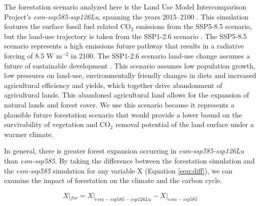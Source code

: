 \documentclass[draft]{agujournal2019}
\begin{document}
The forestation scenario analyzed here is the Land Use Model Intercomparison Project's \textit{esm-ssp585-ssp126Lu}, spanning the years 2015--2100 \cite{lawrence_land_2016}.
This simulation features the surface fossil fuel related CO$_{2}$ emissions from the SSP5-8.5 scenario, but the land-use trajectory is taken from the SSP1-2.6 scenario \cite{oneill_scenario_2016}.
The SSP5-8.5 scenario represents a high emissions future pathway that results in a radiative forcing of 8.5 W m$^{-2}$ in 2100.
The SSP1-2.6 scenario land-use change assumes a future of sustainable development \cite{van_vuuren_energy_2017}.
This scenario assumes low population growth, low pressures on land-use, environmentally friendly changes in diets and increased agricultural efficiency and yields, which together drive abandonment of agricultural lands.
This abandoned agricultural land allows for the expansion of natural lands and forest cover.
We use this scenario because it represents a plausible future forestation scenario that would provide a lower bound on the survivability of vegetation and CO$_2$ removal potential of the land surface under a warmer climate.

In general, there is greater forest expansion occurring in \textit{esm-ssp585-ssp126Lu} than \textit{esm-ssp585}.
By taking the difference between the forestation simulation and the \textit{esm-ssp585} simulation for any variable X (Equation \ref{equ:diff}), we can examine the impact of forestation on the climate and the carbon cycle.

\begin{linenomath*}
\begin{equation}
    X|_{for} = X|_{esm-ssp585-ssp126Lu} - X|_{esm-ssp585}
    \label{equ:diff}
\end{equation}
\end{linenomath*}
\end{document}
